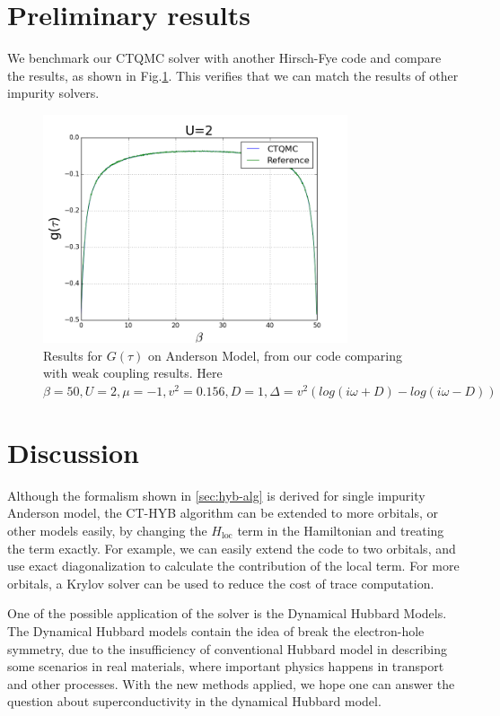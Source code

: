 
\section{Preliminary results}
We benchmark our CTQMC solver with another Hirsch-Fye code and compare the results,
as shown in Fig.\ref{fig:u2}. This verifies that we can match the results of 
other impurity solvers.

\begin{figure}
  \centering
  \label{fig:u2}
  \includegraphics[width=0.8\textwidth] {img/U=2.png}
  \caption{Results for $G(\tau)$ on Anderson Model, from our code comparing with
weak coupling results.
Here $\beta = 50, U = 2, \mu = −1, v^2 = 0.156, D = 1, \Delta = v^2(log(i\omega + D) − log(i\omega − D))$}
\end{figure}



\section{Discussion\label{sec:hyb-concl}}

Although the formalism shown in \ref{sec:hyb-alg} is derived for single 
impurity Anderson model, the CT-HYB algorithm can be extended to more orbitals,
or other models easily, by changing the $H_\textrm{loc}$ term in the Hamiltonian 
and treating the term exactly. For example, we can easily extend the code to two
orbitals, and use exact diagonalization to calculate the contribution of the 
local term. For more orbitals, a Krylov solver \cite{PhysRevB.80.235117} can be used to reduce the cost of
trace computation.

One of the possible application of the solver is the Dynamical Hubbard Models. 
The Dynamical Hubbard models contain the idea of break the electron-hole 
symmetry, due to the insufficiency of conventional Hubbard model in describing 
some scenarios in real materials, where important physics happens in transport 
and other processes. With the new methods applied, we hope one can answer the question 
about superconductivity in the dynamical Hubbard model. 

